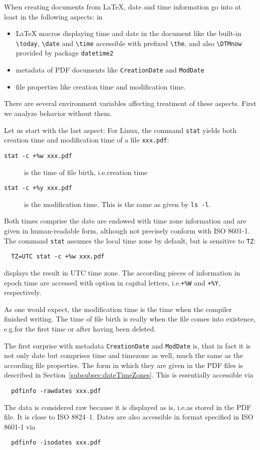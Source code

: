 \documentclass[a4paper, english]{article}%
\newcommand{\cmd}[1]{\texttt{\textbackslash#1}}
\begin{document}
When creating documents from \LaTeX, 
date and time information go into at least in the following aspects: in 
%
\begin{itemize}
\item 
\LaTeX{} macros displaying time and date in the document 
like the built-in \cmd{today}, \cmd{date} and \cmd{time} 
accessible with prefixed \cmd{the}, 
and also \cmd{DTMnow} provided by package \texttt{datetime2} 
\item 
metadata of PDF documents like \texttt{CreationDate} 
and \texttt{ModDate}
\item 
file properties like creation time and modification time. 
\end{itemize}

There are several environment variables affecting treatment of these aspects. 
First we analyze behavior without them. 

Let us start with the last aspect: 
For Linux, the command \texttt{stat} 
yields both creation time and modification time of a file \texttt{xxx.pdf}: 
%
\begin{description}
  \item[\texttt{stat -c +\%w xxx.pdf}] is the time of file birth, i.e.\@ creation time 
  \item[\texttt{stat -c +\%y xxx.pdf}] is the modification time. 
  This is the same as given by \texttt{ls -l}. 
\end{description}
%
Both times comprise the date 
are endowed with time zone information and are given in human-readable form, 
although not precisely conform with ISO 8601-1. 
The command \texttt{stat} assumes the local time zone by default, 
but is sensitive to \texttt{TZ}: 
%
\begin{verbatim}
  TZ=UTC stat -c +%w xxx.pdf
\end{verbatim}
%
displays the result in UTC time zone. 
The according pieces of information in epoch time 
are accessed with option in capital letters, 
i.e.\@ \texttt{+\%W} and \texttt{+\%Y}, respectively. 
\medskip


As one would expect, the modification time is the time when the compiler finished writing. 
The time of file birth is really when the file comes into existence, 
e.g.\@ for the first time or after having been deleted. 

The first surprise with metadata \texttt{CreationDate} and \texttt{ModDate} is, 
that in fact it is not only date but comprises time and timezone as well, 
much the same as the according file properties. 
The form in which they are given in the PDF files 
is described in Section~\ref{subsubsec:dateTimeZones}. 
This is essentially accessible via 
%
\begin{verbatim}
  pdfinfo -rawdates xxx.pdf
\end{verbatim}
%
The data is considered raw because it is displayed as is, i.e.\@ as stored in the PDF file. 
It is close to ISO 8824--1. 
Dates are also accessible in format specified in ISO 8601-1 via 
%
\begin{verbatim}
  pdfinfo -isodates xxx.pdf
\end{verbatim}
\end{document}
